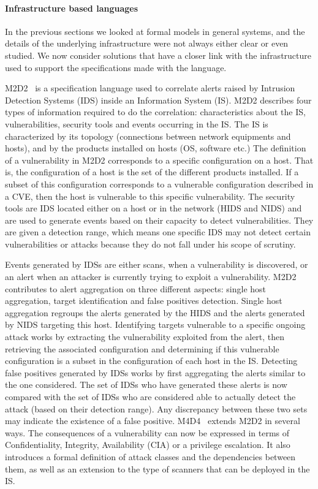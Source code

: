 \paragraph{Infrastructure based languages}
In the previous sections we looked at formal models in general systems, and the details of the underlying infrastructure were not always either clear or even studied. We now consider solutions that have a closer link with the infrastructure used to support the specifications made with the language.

M2D2~\cite{M2D2-Morin2002} is a specification language used to correlate alerts raised by Intrusion Detection Systems (IDS) inside an Information System (IS).
M2D2 describes four types of information required to do the correlation: characteristics about the IS, vulnerabilities, security tools and events occurring in the IS.
The IS is characterized by its topology (connections between network equipments and hosts), and by the products installed on hosts (\eg OS, software etc.)
The definition of a vulnerability in M2D2 corresponds to a specific configuration on a host.
That is, the configuration of a host is the set of the different products installed.
If a subset of this configuration corresponds to a vulnerable configuration described in a CVE, then the host is vulnerable to this specific vulnerability.
The security tools are IDS located either on a host or in the network (HIDS and NIDS) and are used to generate events based on their capacity to detect vulnerabilities.
They are given a detection range, which means one specific IDS may not detect certain vulnerabilities or attacks because they do not fall under his scope of scrutiny. 

Events generated by IDSs are either scans, when a vulnerability is discovered, or an alert when an attacker is currently trying to exploit a vulnerability.
M2D2 contributes to alert aggregation on three different aspects: single host aggregation, target identification and false positives detection.
Single host aggregation regroups the alerts generated by the HIDS and the alerts generated by NIDS targeting this host.
Identifying targets vulnerable to a specific ongoing attack works by extracting the vulnerability exploited from the alert, then retrieving the associated configuration and determining if this vulnerable configuration is a subset in the configuration of each host in the IS.
Detecting false positives generated by IDSs works by first aggregating the alerts similar to the one considered.
The set of IDSs who have generated these alerts is now compared with the set of IDSs who are considered able to actually detect the attack (based on their detection range).
Any discrepancy between these two sets may indicate the existence of a false positive.
M4D4~\cite{M4D4-Morin2008} extends M2D2 in several ways. The consequences of a vulnerability can now be expressed in terms of Confidentiality, Integrity, Availability (CIA) or a privilege escalation.
It also introduces a formal definition of attack classes and the dependencies between them, as well as an extension to the type of scanners that can be deployed in the IS.

